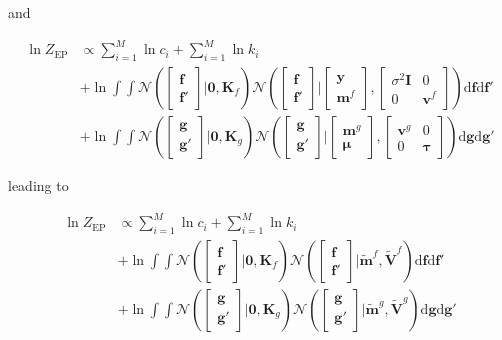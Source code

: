 \documentclass[10pt,a4paper]{article}
\begin{document}
and

\begin{align}
\ln Z_\text{EP} &\propto \sum_{i=1}^M \ln c_i + \sum_{i=1}^M \ln k_i\\
& +  \ln  \int \!\!\!\!\int \mathcal{N}\left(\begin{bmatrix}\bm{f}\\\bm{f}'\end{bmatrix}\big| \bm{0}, \bm{K}_f\right)\mathcal{N}\left(\begin{bmatrix}\bm{f}\\\bm{f}'\end{bmatrix}\big| \begin{bmatrix}\bm{y}\\ \mathbf{m}^f\end{bmatrix}, \begin{bmatrix}\sigma^2 \bm{I}&0\\0&\mathbf{v}^f\end{bmatrix}\right)  \text{d}\mathbf{f}\text{d}\mathbf{f}'\\
& + \ln \int \!\!\!\!\int  \mathcal{N}\left(\begin{bmatrix}\bm{g}\\\bm{g}'\end{bmatrix}\big| \bm{0}, \bm{K}_g\right) \mathcal{N}\left(\begin{bmatrix}\bm{g}\\\bm{g}'\end{bmatrix}\big| \begin{bmatrix}\mathbf{m}^g\\\bm{\mu}  \end{bmatrix}, \begin{bmatrix}\mathbf{v}^g&0\\0&\bm{\tau}\end{bmatrix}\right) \text{d}\mathbf{g}\text{d}\mathbf{g}'
\end{align}

leading to

\begin{align}
\ln Z_\text{EP} &\propto \sum_{i=1}^M \ln c_i + \sum_{i=1}^M \ln k_i\\
& +  \ln  \int \!\!\!\!\int \mathcal{N}\left(\begin{bmatrix}\bm{f}\\\bm{f}'\end{bmatrix}\big| \bm{0}, \bm{K}_f\right)\mathcal{N}\left(\begin{bmatrix}\bm{f}\\\bm{f}'\end{bmatrix}\big| \tilde{\mathbf{m}}^f, \tilde{\mathbf{V}}^f \right)  \text{d}\mathbf{f}\text{d}\mathbf{f}'\\
& + \ln \int \!\!\!\!\int  \mathcal{N}\left(\begin{bmatrix}\bm{g}\\\bm{g}'\end{bmatrix}\big| \bm{0}, \bm{K}_g\right) \mathcal{N}\left(\begin{bmatrix}\bm{g}\\\bm{g}'\end{bmatrix}\big| \tilde{\mathbf{m}}^g, \tilde{\mathbf{V}}^g \right) \text{d}\mathbf{g}\text{d}\mathbf{g}'
\end{align}
\end{document}
